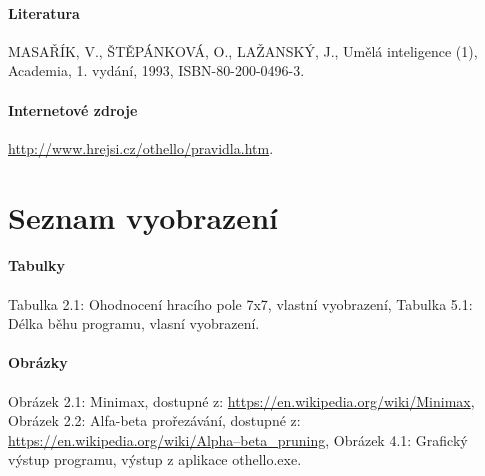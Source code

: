 \documentclass[
12pt,
a4paper,
pdftex,
czech,
titlepage
]{report}
\begin{document}
\subsubsection{Literatura}
MASAŘÍK, V., ŠTĚPÁNKOVÁ, O., LAŽANSKÝ, J., Umělá inteligence (1), Academia, 1. vydání, 1993, ISBN-80-200-0496-3.
\subsubsection{Internetové zdroje}
\url{http://www.hrejsi.cz/othello/pravidla.htm}.

\chapter{Seznam vyobrazení}
\subsubsection{Tabulky}
 Tabulka 2.1: Ohodnocení hracího pole 7x7, vlastní vyobrazení,
\newline Tabulka 5.1: Délka běhu programu, vlasní vyobrazení.
\subsubsection{Obrázky}
Obrázek 2.1: Minimax, dostupné z: 
\url {https://en.wikipedia.org/wiki/Minimax},
\newline Obrázek 2.2: Alfa-beta prořezávání, dostupné z: \url{https://en.wikipedia.org/wiki/Alpha–beta_pruning},
\newline Obrázek 4.1: Grafický výstup programu, výstup z aplikace othello.exe.
\end{document}
